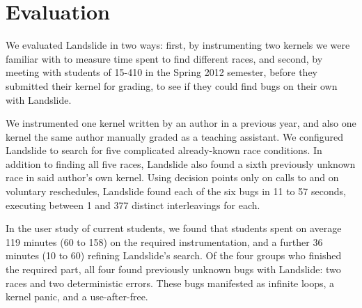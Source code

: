 \section{Evaluation}
\label{sec:eval}

We evaluated Landslide in two ways: first, by instrumenting two kernels we were familiar with to measure time spent to find different races, and second, by meeting with students of 15-410 in the Spring 2012 semester, before they submitted their kernel for grading, to see if they could find bugs on their own with Landslide.

We instrumented one kernel written by an author in a previous year, and also one kernel the same author manually graded as a teaching assistant.
We configured Landslide to search for five complicated already-known race conditions.
In addition to finding all five races, Landslide also found a sixth previously unknown race in said author's own kernel.
Using decision points only on calls to  and on voluntary reschedules, Landslide found each of the six bugs in 11 to 57 seconds, executing between 1 and 377 distinct interleavings for each.

In the user study of current students, we found that students spent on average 119 minutes (60 to 158) on the required instrumentation, and a further 36 minutes (10 to 60) refining Landslide's search.
Of the four groups who finished the required part, all four found previously unknown bugs with Landslide: two races and two deterministic errors.
These bugs manifested as infinite loops, a kernel panic, and a use-after-free.


